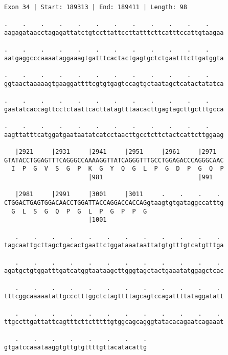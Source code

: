 \documentclass{article}
\begin{document}
\newpage
\begin{Verbatim}[fontfamily=courier]
Exon 34 | Start: 189313 | End: 189411 | Length: 98

.    .    .    .    .    .    .    .    .    .    .    .    
aagagataacctagagattatctgtccttattccttatttcttcatttccattgtaagaa

.    .    .    .    .    .    .    .    .    .    .    .    
aatgaggcccaaaataggaaagtgatttcactactgagtgctctgaatttcttgatggta

.    .    .    .    .    .    .    .    .    .    .    .    
ggtaactaaaaagtgaaggattttcgtgtgagtccagtgctaatagctcatactatatca

.    .    .    .    .    .    .    .    .    .    .    .    
gaatatcaccagttcctctaattcacttatagtttaacacttgagtagcttgctttgcca

.    .    .    .    .    .    .    .    .    .    .    .    
aagttatttcatggatgaataatatcatcctaacttgcctcttctactcattcttggaag

   |2921     |2931     |2941     |2951     |2961     |2971  
GTATACCTGGAGTTTCAGGGCCAAAAGGTTATCAGGGTTTGCCTGGAGACCCAGGGCAAC
  I  P  G  V  S  G  P  K  G  Y  Q  G  L  P  G  D  P  G  Q  P
                       |981                          |991   

   |2981     |2991     |3001     |3011     .    .    .    . 
CTGGACTGAGTGGACAACCTGGATTACCAGGACCACCAGgtaagtgtgataggccatttg
  G  L  S  G  Q  P  G  L  P  G  P  P  G                     
                       |1001                                

   .    .    .    .    .    .    .    .    .    .    .    . 
tagcaattgcttagctgacactgaattctggataaataattatgtgtttgtcatgtttga

   .    .    .    .    .    .    .    .    .    .    .    . 
agatgctgtggatttgatcatggtaataagcttgggtagctactgaaatatggagctcac

   .    .    .    .    .    .    .    .    .    .    .    . 
tttcggcaaaaatattgccctttggctctagttttagcagtccagattttataggatatt

   .    .    .    .    .    .    .    .    .    .    .    . 
ttgccttgattattcagtttcttctttttgtggcagcagggtatacacagaatcagaaat

   .    .    .    .    .    .    .    .
gtgatccaaataaggtgttgtgttttgttacatacattg
\end{Verbatim}
\newpage
\end{document}

